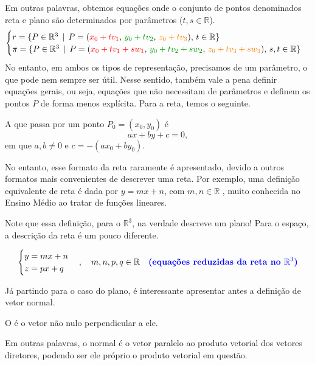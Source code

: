 \documentclass[../main.tex]{subfiles}
\begin{document}
			Em outras palavras, obtemos equações onde o conjunto de pontos denominados reta e plano são determinados por parâmetros ($t,s\in \mathbb{R}$).
			\[
			\begin{cases}
				r=\{P\in \mathbb{R}^3\, \mid\, 	P=(\textcolor{red}{x_0+tv_1},\,\textcolor{green!60!black}{y_0+tv_2},\, \textcolor{orange}{z_0+tv_3}),\, t\in\mathbb{R}\}
				\\
				\pi = \{P\in \mathbb{R}^3\, \mid \, 	P=(\textcolor{red}{x_0+tv_1+sw_1}, \, \textcolor{green!60!black}{y_0+tv_2+sw_2}, \, \textcolor{orange}{z_0+tv_3+sw_3}),\, s,t\in \mathbb{R}\}
			\end{cases}
			\]
			No entanto, em ambos os tipos de representação, precisamos de um parâmetro, o que pode nem sempre ser útil. Nesse sentido, também vale a pena definir equações gerais, ou seja, equações que não necessitam de parâmetros e definem os pontos $P$ de forma menos explícita. Para a reta, temos o seguinte.
			\begin{proposicao}
				A  que passa por um ponto 
				$P_0 = (x_0, y_0)$ é
				\[
				ax + by + c = 0,
				\]
				em que $a,b \neq 0$ e $c = -(ax_0 + by_0)$.
			\end{proposicao}
			
			No entanto, esse formato da reta raramente é apresentado, devido a outros formatos mais convenientes de descrever uma reta. Por exemplo, uma definição equivalente de reta é dada por $y=mx+n$, com $m, n\in \mathbb{R}$ , muito conhecida no Ensino Médio ao tratar de funções lineares.
			
			Note que essa definição, para o $\mathbb{R}^3$, na verdade descreve um plano! Para o espaço, a descrição da reta é um pouco diferente.
			
			\[
			\begin{cases}
				y=mx+n\\
				z=px+q
			\end{cases},\quad m,n,p,q\in \mathbb{R}\quad 	\text{\textbf{\textcolor{blue}{(equações reduzidas da reta no $\mathbb{R}^3$)}}}
			\]
			
			Já partindo para o caso do plano, é interessante apresentar antes a definição de vetor normal.
			\begin{definicao}
				O  é o vetor não nulo perpendicular a ele.
			\end{definicao}
			Em outras palavras, o normal é o vetor paralelo ao produto vetorial dos vetores diretores, podendo ser ele próprio o produto vetorial em questão.
			
\end{document}

